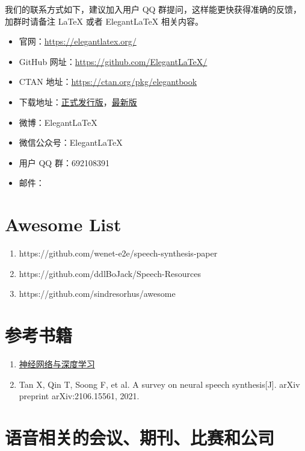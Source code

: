 \documentclass[cn,10pt,math=newtx,citestyle=gb7714-2015,bibstyle=gb7714-2015]{elegantbook}
\begin{document}
我们的联系方式如下，建议加入用户 QQ 群提问，这样能更快获得准确的反馈，加群时请备注 \LaTeX{} 或者 Elegant\LaTeX{} 相关内容。
\begin{itemize}
  \item 官网：\href{https://elegantlatex.org/}{https://elegantlatex.org/}
  \item GitHub 网址：\href{https://github.com/ElegantLaTeX/}{https://github.com/ElegantLaTeX/}
  \item CTAN 地址：\href{https://ctan.org/pkg/elegantbook}{https://ctan.org/pkg/elegantbook}
  \item 下载地址：\href{https://github.com/ElegantLaTeX/ElegantBook/releases}{正式发行版}，\href{https://github.com/ElegantLaTeX/ElegantBook/archive/master.zip}{最新版}
  \item 微博：Elegant\LaTeX{}
  \item 微信公众号：Elegant\LaTeX{}
  \item 用户 QQ 群：692108391 
  \item 邮件：
\end{itemize}

\section{Awesome List}
\begin{enumerate}
  \item https://github.com/wenet-e2e/speech-synthesis-paper
  \item https://github.com/ddlBoJack/Speech-Resources
  \item https://github.com/sindresorhus/awesome
\end{enumerate}

\section{参考书籍}
\begin{enumerate}
  \item \href{https://nndl.github.io/}{神经网络与深度学习}
  \item Tan X, Qin T, Soong F, et al. A survey on neural speech synthesis[J]. arXiv preprint arXiv:2106.15561, 2021.
\end{enumerate}

\section{语音相关的会议、期刊、比赛和公司}
\end{document}
